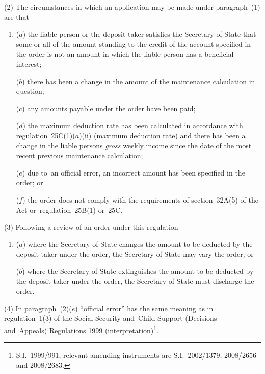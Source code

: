\documentclass[12pt,a4paper]{article}
\begin{document}
(2) The circumstances in which an application may be made under paragraph~(1) are that—
\begin{enumerate}\item[]
($a$) the liable person or the deposit-taker satisfies the 
Secretary of State  %
that some or all of the amount standing to the credit of the account specified in the order is not an amount in which the liable person has a beneficial interest;

($b$) there has been a change in the amount of the maintenance calculation in question;

($c$) any amounts payable under the order have been paid;

($d$) the maximum deduction rate has been calculated in accordance with regulation~25C(1)($a$)(ii)  (maximum deduction rate) and there has been a change in the liable persons 
\emph{gross}  %
weekly income since the date of the most recent previous maintenance calculation;

($e$) due to~an official error, an incorrect amount has been specified in the order; or

($f$) the order does not comply with the requirements of section~32A(5) of the Act or~regulation~25B(1) or~25C.
\end{enumerate}

(3) Following a review of an order under this regulation—
\begin{enumerate}\item[]
($a$) where the 
Secretary of State  %
changes the amount to be deducted by the deposit-taker under the order, 
the Secretary of State  %
may vary the order; or

($b$) where the 
Secretary of State  %
extinguishes the amount to be deducted by the deposit-taker under the order, 
the Secretary of State  %
must discharge the order.
\end{enumerate}

(4) In paragraph~(2)($e$)  “official error” has the same meaning as in regulation~1(3) of the Social Security and~Child Support (Decisions and~Appeals) Regulations 1999 (interpretation)\footnote{S.I.~1999/991, relevant amending instruments are S.I.~2002/1379, 2008/2656 and 2008/2683.}.
\end{document}
